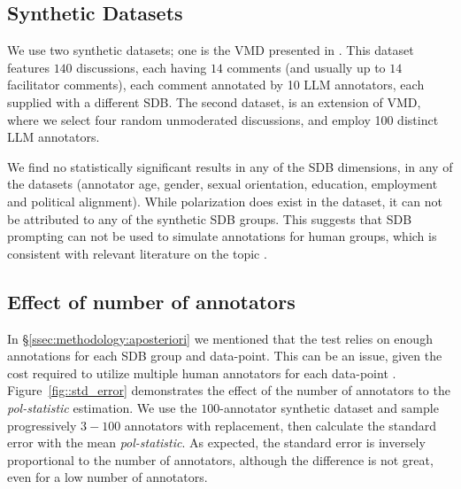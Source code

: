 \documentclass{article}
\begin{document}
\subsection{Synthetic Datasets}

We use two synthetic datasets; one is the \ac{VMD} presented in \textcite{tsirmpas2025scalableevaluationonlinefacilitation}. This dataset features $140$ discussions, each having $14$ comments (and usually up to $14$ facilitator comments), each comment annotated by 10 \ac{LLM} annotators, each supplied with a different \ac{SDB}. The second dataset, is an extension of \ac{VMD}, where we select four random unmoderated discussions, and employ 100 distinct \ac{LLM} annotators.

We find no statistically significant results in any of the \ac{SDB} dimensions, in any of the datasets (annotator age, gender, sexual orientation, education, employment and political alignment). While polarization does exist in the dataset, %
it can not be attributed to any of the synthetic \ac{SDB} groups. This suggests that \ac{SDB} prompting can not be used to simulate annotations for human groups, which is consistent with relevant literature on the topic \parencite{anthis_2025,hewitt2024predicting,rossi_2024,jansen_2023,bisbee_2023,neumann_2025}.


\subsection{Effect of number of annotators}
\label{ssec: results:num_annotators}

In \S\ref{ssec:methodology:aposteriori} we mentioned that the test relies on enough annotations for each \ac{SDB} group and data-point. This can be an issue, given the cost required to utilize multiple human annotators for each data-point \parencite{rossi_2024}. Figure~\ref{fig::std_error} demonstrates the effect of the number of annotators to the \textit{pol-statistic} estimation. We use the $100$-annotator synthetic dataset and sample progressively $3-100$ annotators with replacement, then calculate the standard error with the mean \textit{pol-statistic}. As expected, the standard error is inversely proportional to the number of annotators, although the difference is not great, even for a low number of annotators.
\end{document}
